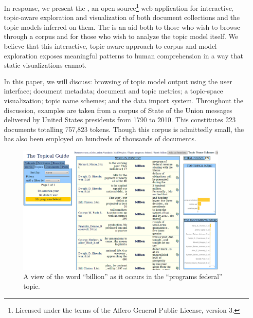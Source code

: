 \documentclass[11pt]{article}
\newcommand{\comments}[1]{}
\begin{document}
In response, we present the \tool, an open-source\footnote{Licensed under the terms of the Affero
General Public License, version 3.} web application for interactive,
topic-aware exploration and visualization of both document collections and the
topic models inferred on them.\comments{\footnote{Further information on the project, including %
source code access and a live demonstration server, can be found
at \texttt{\projecturl}.}} The \tool{} is an aid both to those who wish to
browse through a corpus and for those who wish to analyze the topic model itself.
We believe that this interactive, topic-aware approach to corpus and model exploration
exposes meaningful patterns to human comprehension in a way that static visualizations cannot.

In this paper, we will discuss: browsing of topic model output using the \tool{} user interface\comments{, as in \newcite{gardner_browser_2010}}; %
document metadata; document and topic metrics; a topic-space visualization;
topic name schemes; and the data import
system. Throughout the discussion, examples are taken from a
corpus of State of the Union messages delivered by United States presidents
from 1790 to 2010. This constitutes 223 documents totalling 757,823 tokens.
Though this corpus is admittedly small, the \tool{} has also been employed
on hundreds of thousands of documents. %

\begin{figure}[t]
 \centering
 \includegraphics[width=400px,keepaspectratio=true]{./topic_word_view3.png}
 \caption{A view of the word ``billion'' as it occurs in the ``programs federal'' topic.}
 \label{fig:topic_word}
\end{figure}
\end{document}
